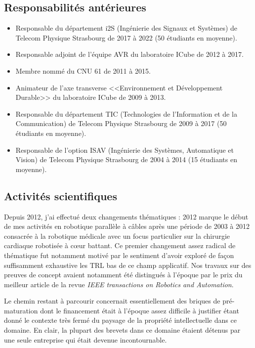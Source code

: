 \documentclass[a4paper,12pt]{article}
\begin{document}
\subsection{Responsabilités antérieures}

\begin{itemize}
    \item Responsable du département i2S (Ingénierie des Signaux et Systèmes) de Telecom Physique Strasbourg de 2017 à 2022 (50 étudiants en moyenne).
    \item Responsable adjoint de l'équipe AVR du laboratoire ICube de 2012 à 2017.
    \item Membre nommé du CNU 61 de 2011 à 2015.
    \item Animateur de l'axe transverse <<Environnement et Développement Durable>> du laboratoire ICube de 2009 à 2013.
    \item Responsable du département TIC (Technologies de l'Information et de la Communication) de Telecom Physique Strasbourg de 2009 à 2017 (50 étudiants en moyenne).
    \item Responsable de l'option ISAV (Ingénierie des Systèmes, Automatique et Vision) de Telecom Physique Strasbourg de 2004 à 2014 (15 étudiants en moyenne).
\end{itemize}

\subsection{Activités scientifiques}

Depuis 2012, j'ai effectué deux changements thématiques : 2012 marque le début de mes activités en robotique parallèle à câbles après une période de 2003 à 2012 consacrée à la robotique médicale avec un focus particulier sur la chirurgie cardiaque robotisée à cœur battant. Ce premier changement assez radical de thématique fut notamment motivé par le sentiment d'avoir exploré de façon suffisamment exhaustive les TRL bas de ce champ applicatif. Nos travaux sur des preuves de concept avaient notamment été distingués à l'époque par le prix du meilleur article de la revue \textit{IEEE transactions on Robotics and Automation}. 

Le chemin restant à parcourir concernait essentiellement des briques de pré-maturation dont le financement était à l'époque assez difficile à justifier étant donné le contexte très fermé du paysage de la propriété intellectuelle dans ce domaine. En clair, la plupart des brevets dans ce domaine étaient détenus par une seule entreprise qui était devenue incontournable.
\end{document}
